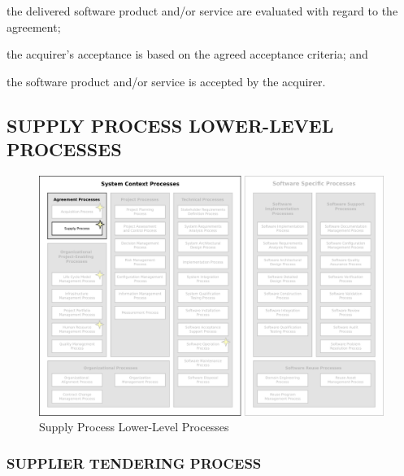 			\begin{adjustwidth}{2em}{0pt} 

				\begin{compactitem}

					\item the delivered software product and/or service are evaluated with regard to the agreement;

					\item the acquirer's acceptance is based on the agreed acceptance criteria; and

					\item the software product and/or service is accepted by the acquirer.

				\end{compactitem}

			\end{adjustwidth}



	\newpage
	\subsection{SUPPLY PROCESS LOWER-LEVEL PROCESSES\label{llsubsec:supply_processes}}
	\begin{figure}[h]
		\centering
		\includegraphics[width=15cm,keepaspectratio]{figures/life-cycle-process-groups-lower-level-supply-processes.pdf}
		\caption{Supply Process Lower-Level Processes}
		\label{fig:lower_level_supply_processes}
	\end{figure}
		
		\subsubsection{SUPPLIER TENDERING PROCESS\label{llproc:supplier_tendering_process}}


